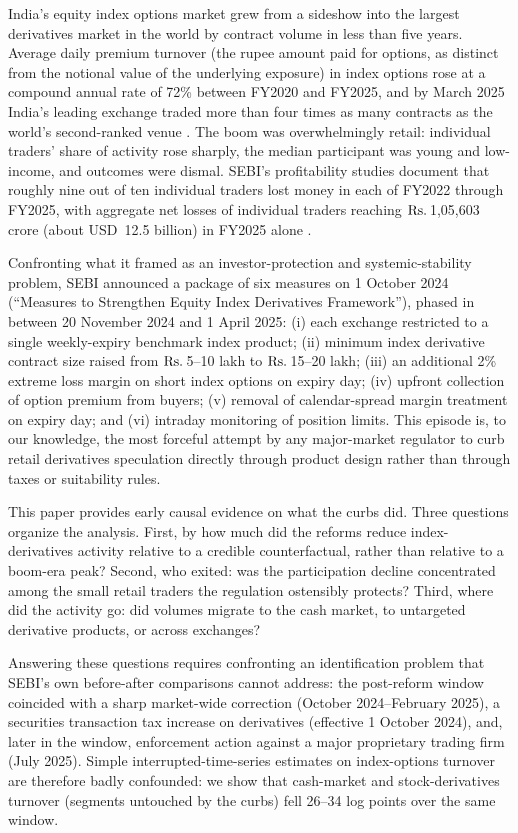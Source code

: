 \documentclass[12pt]{article}
\newcommand{\rupee}{\text{Rs.}\,}
\begin{document}
India's equity index options market grew from a sideshow into the largest
derivatives market in the world by contract volume in less than five years.
Average daily premium turnover (the rupee amount paid for options, as
distinct from the notional value of the underlying exposure) in index
options rose at a compound annual rate
of 72\% between FY2020 and FY2025, and by March 2025 India's leading exchange
traded more than four times as many contracts as the world's second-ranked
venue \citep{sebi2025comparative}. The boom was overwhelmingly retail:
individual traders' share of activity rose sharply, the median participant
was young and low-income, and outcomes were dismal. SEBI's profitability
studies document that roughly nine out of ten individual traders lost money
in each of FY2022 through FY2025, with aggregate net losses of individual
traders reaching \(\text{\rupee}\)1,05,603 crore (about USD~12.5 billion) in
FY2025 alone \citep{sebi2023study,sebi2024study,sebi2025comparative}.

Confronting what it framed as an investor-protection and systemic-stability
problem, SEBI announced a package of six measures on 1 October 2024
(``Measures to Strengthen Equity Index Derivatives Framework''), phased in
between 20 November 2024 and 1 April 2025: (i) each exchange restricted to a
single weekly-expiry benchmark index product; (ii) minimum index derivative
contract size raised from \(\text{\rupee}\)5--10 lakh to
\(\text{\rupee}\)15--20 lakh; (iii) an additional 2\% extreme loss margin on
short index options on expiry day; (iv) upfront collection of option premium
from buyers; (v) removal of calendar-spread margin treatment on expiry day;
and (vi) intraday monitoring of position limits. This episode is, to our
knowledge, the most forceful attempt by any major-market regulator to curb
retail derivatives speculation directly through product design rather than
through taxes or suitability rules.

This paper provides early causal evidence on what the curbs did. Three
questions organize the analysis. First, by how much did the reforms reduce
index-derivatives activity relative to a credible counterfactual, rather than
relative to a boom-era peak? Second, who exited: was the participation
decline concentrated among the small retail traders the regulation ostensibly
protects? Third, where did the activity go: did volumes migrate to the cash
market, to untargeted derivative products, or across exchanges?

Answering these questions requires confronting an identification problem that
SEBI's own before-after comparisons cannot address: the post-reform window
coincided with a sharp market-wide correction (October 2024--February 2025),
a securities transaction tax increase on derivatives (effective 1 October
2024), and, later in the window, enforcement action against a major
proprietary trading firm (July 2025). Simple interrupted-time-series
estimates on index-options turnover are therefore badly confounded: we show
that cash-market and stock-derivatives turnover (segments untouched by the
curbs) fell 26--34 log points over the same window.
\end{document}

